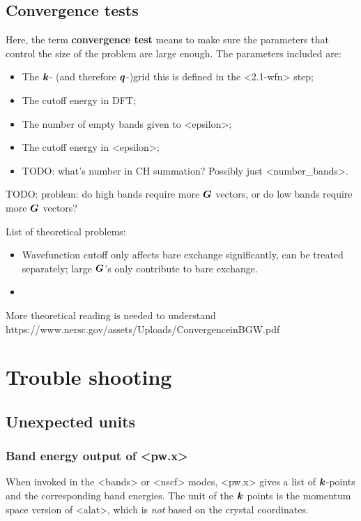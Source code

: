 \documentclass[hyperref, a4paper]{report}
\newcommand*{\concept}[1]{{\textbf{#1}}}
\def\texttt#1{<#1>}%
\newcommand{\shortcode}[1]{\texttt{#1}}
\begin{document}
\section{Convergence tests}

Here, the term \concept{convergence test} means 
to make sure the parameters that control the size of the problem 
are large enough. 
The parameters included are: 
\begin{itemize}
    \item The $\vb*{k}$- (and therefore $\vb*{q}$-)grid
        this is defined in the \shortcode{2.1-wfn} step;
    \item The cutoff energy in DFT; 
    \item The number of empty bands given to \shortcode{epsilon}; 
    \item The cutoff energy in \shortcode{epsilon}; 
    \item TODO: what's number in CH summation? Possibly just \shortcode{number_bands}.
\end{itemize}

TODO: problem: do high bands require more $\vb*{G}$ vectors, 
or do low bands require more $\vb*{G}$ vectors?

List of theoretical problems: 
\begin{itemize}
    \item Wavefunction cutoff only affects bare exchange 
    significantly, can be treated separately; 
    large $\vb*{G}$'s only contribute to bare exchange. 
    \item 
\end{itemize}

More theoretical reading is needed to understand
https://www.nersc.gov/assets/Uploads/ConvergenceinBGW.pdf

\chapter{Trouble shooting}

\section{Unexpected units}

\subsection{Band energy output of \shortcode{pw.x}}

When invoked in the \shortcode{bands} or \shortcode{nscf} modes, 
\shortcode{pw.x} gives a list of $\vb*{k}$-points 
and the corresponding band energies. 
The unit of the $\vb*{k}$ points is the momentum space version of \shortcode{alat},
which is \emph{not} based on the crystal coordinates.
\end{document}
